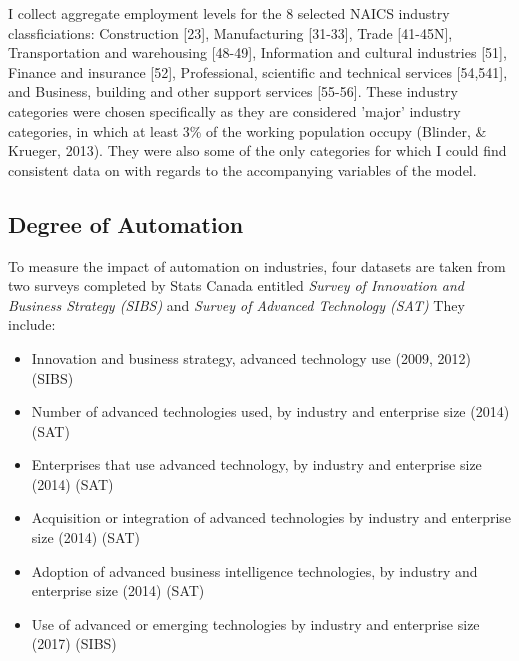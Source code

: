 \documentclass[12pt]{article}
\begin{document}
I collect aggregate employment levels for the 8 selected NAICS industry classficiations: Construction [23], Manufacturing [31-33], Trade [41-45N], Transportation and warehousing [48-49], Information and cultural industries [51], Finance and insurance [52], Professional, scientific and technical services [54,541], and Business, building and other support services [55-56].
\break
\linebreak
These industry categories were chosen specifically as they are considered 'major' industry categories, in which at least 3\% of the working population occupy (Blinder, \& Krueger, 2013). They were also some of the only categories for which I could find consistent data on with regards to the accompanying variables of the model. 

\newpage

\subsection{Degree of Automation}

To measure the impact of automation on industries, four datasets are taken from two surveys completed by Stats Canada entitled \textit{Survey of Innovation and Business Strategy (SIBS)} and \textit{Survey of Advanced Technology (SAT)} They include:

\begin{itemize}
\item Innovation and business strategy, advanced technology use (2009, 2012) (SIBS)
\item Number of advanced technologies used, by industry and enterprise size (2014) (SAT)
\item Enterprises that use advanced technology, by industry and enterprise size (2014) (SAT)
\item Acquisition or integration of advanced technologies by industry and enterprise size (2014) (SAT)
\item Adoption of advanced business intelligence technologies, by industry and enterprise size (2014) (SAT)
\item Use of advanced or emerging technologies by industry and enterprise size (2017) (SIBS)
\end{itemize}
\end{document}

